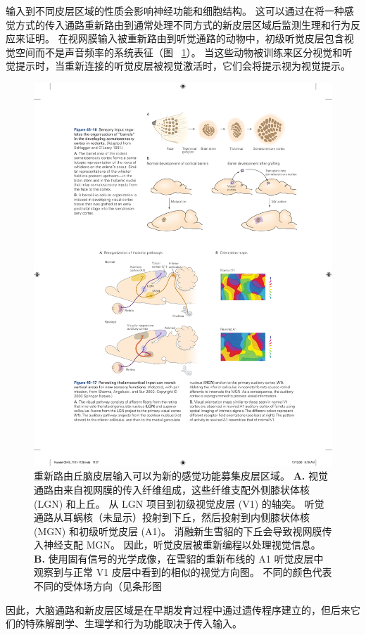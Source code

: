 输入到不同皮层区域的性质会影响神经功能和细胞结构。
这可以通过在将一种感觉方式的传入通路重新路由到通常处理不同方式的新皮层区域后监测生理和行为反应来证明。
在视网膜输入被重新路由到听觉通路的动物中，初级听觉皮层包含视觉空间而不是声音频率的系统表征（图 ~\ref{fig:45_17}）。
当这些动物被训练来区分视觉和听觉提示时，当重新连接的听觉皮层被视觉激活时，它们会将提示视为视觉提示。


\begin{figure}[htbp]
	\centering
	\includegraphics[width=0.8\linewidth]{chap45/fig_45_17}
	\caption{重新路由丘脑皮层输入可以为新的感觉功能募集皮层区域\cite{sharma2000induction}。
		\textbf{A.} 视觉通路由来自视网膜的传入纤维组成，这些纤维支配外侧膝状体核 (LGN) 和上丘。
		从 LGN 项目到初级视觉皮层 (V1) 的轴突。
		听觉通路从耳蜗核（未显示）投射到下丘，然后投射到内侧膝状体核 (MGN) 和初级听觉皮层 (A1)。
		消融新生雪貂的下丘会导致视网膜传入神经支配 MGN。
		因此，听觉皮层被重新编程以处理视觉信息。
		\textbf{B.} 使用固有信号的光学成像，在雪貂的重新布线的 A1 听觉皮层中观察到与正常 V1 皮层中看到的相似的视觉方向图。
		不同的颜色代表不同的受体场方向（见条形图}
	\label{fig:45_17}
\end{figure}


因此，大脑通路和新皮层区域是在早期发育过程中通过遗传程序建立的，但后来它们的特殊解剖学、生理学和行为功能取决于传入输入。



